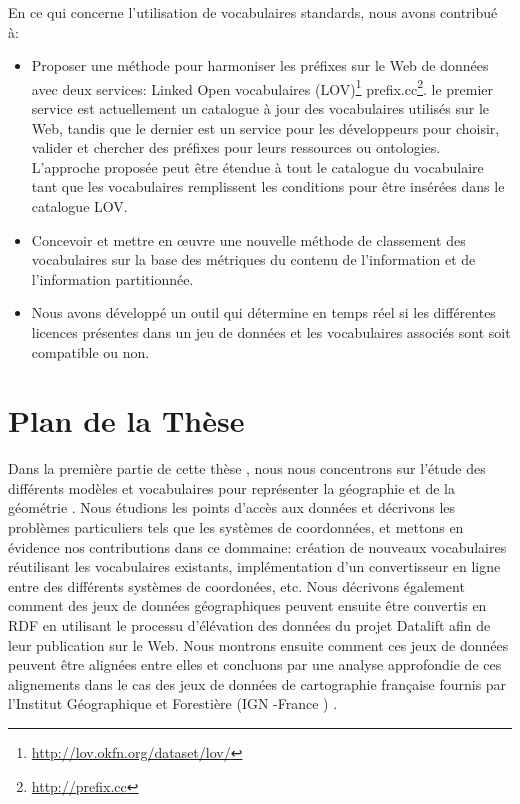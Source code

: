 \documentclass[a4paper,11pt,twoside]{report}
\begin{document}
En ce qui concerne l'utilisation de vocabulaires standards, nous avons contribué à: 
\begin{itemize}

\item  
Proposer une méthode pour harmoniser les préfixes sur le Web de données avec deux services: Linked Open vocabulaires (LOV)\footnote{\url{http://lov.okfn.org/dataset/lov/}} prefix.cc\footnote{\url{http://prefix.cc}}. le premier service est actuellement un catalogue à jour des vocabulaires utilisés sur le Web, tandis que le dernier est un service pour les développeurs pour choisir, valider et chercher des préfixes pour leurs ressources ou ontologies. L'approche proposée peut être étendue à tout le catalogue du vocabulaire tant que les vocabulaires remplissent les conditions pour être insérées dans le catalogue LOV.


\item  
Concevoir et mettre en œuvre une nouvelle méthode de classement des vocabulaires sur la base des métriques du contenu de l'information et de l'information partitionnée.

\item 
Nous avons développé un outil qui détermine en temps réel si les différentes licences présentes dans un jeu de données et les vocabulaires associés sont soit compatible ou non.

\end{itemize}









\chapter*{Plan de la Thèse} 
\label{sec:thesis-structure}

Dans la première partie de cette thèse , nous nous concentrons sur l'étude des différents modèles et vocabulaires pour représenter la géographie et de la géométrie . Nous étudions les points d'accès aux données et décrivons les problèmes particuliers tels que les systèmes de coordonnées, et mettons en évidence nos contributions dans ce dommaine: création de nouveaux vocabulaires réutilisant les vocabulaires existants, implémentation d'un convertisseur en ligne entre des différents systèmes de coordonées, etc. Nous décrivons également comment des jeux de données géographiques peuvent ensuite être convertis en RDF en utilisant le processu d'élévation des données du projet Datalift afin de leur publication sur le Web. Nous montrons ensuite comment ces jeux de données peuvent être alignées entre elles et concluons par une analyse approfondie de ces alignements dans le cas des jeux de données de cartographie française fournis par l'Institut Géographique et Forestière (IGN -France ) . 
\end{document}
